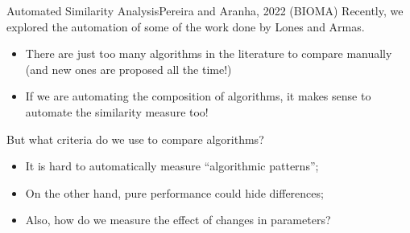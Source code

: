 \documentclass[aspectratio=169]{beamer}
\begin{document}
\begin{frame}{Automated Similarity Analysis}{Pereira and Aranha, 2022 (BIOMA)}
  Recently, we explored the automation of some of the work done by Lones and Armas.
  \begin{itemize}
    \item There are just too many algorithms in the literature to
      compare manually (and new ones are proposed all the time!)
    \item If we are automating the composition of algorithms, it makes
      sense to automate the similarity measure too!
  \end{itemize}\bigskip

  But what criteria do we use to compare algorithms?
  \begin{itemize}
  \item It is hard to automatically measure ``algorithmic patterns'';
  \item On the other hand, pure performance could hide differences;
  \item Also, how do we measure the effect of changes in parameters?
  \end{itemize}
\end{frame}
\end{document}
